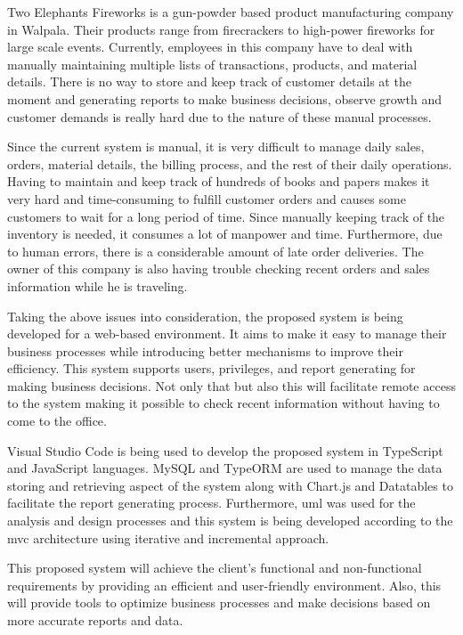 \documentclass[12pt]{report}
\begin{document}
Two Elephants Fireworks is a gun-powder based product manufacturing company in Walpala. Their products range from firecrackers to high-power fireworks for large scale events. Currently, employees in this company have to deal with manually maintaining multiple lists of transactions, products, and material details. There is no way to store and keep track of customer details at the moment and generating reports to make business decisions, observe growth and customer demands is really hard due to the nature of these manual processes.

Since the current system is manual, it is very difficult to manage daily sales, orders, material details, the billing process, and the rest of their daily operations. Having to maintain and keep track of hundreds of books and papers makes it very hard and time-consuming to fulfill customer orders and causes some customers to wait for a long period of time. Since manually keeping track of the inventory is needed, it consumes a lot of manpower and time. Furthermore, due to human errors, there is a considerable amount of late order deliveries. The owner of this company is also having trouble checking recent orders and sales information while he is traveling.

Taking the above issues into consideration, the proposed system is being developed for a web-based environment. It aims to make it easy to manage their business processes while introducing better mechanisms to improve their efficiency. This system supports users, privileges, and report generating for making business decisions. Not only that but also this will facilitate remote access to the system making it possible to check recent information without having to come to the office.

Visual Studio Code is being used to develop the proposed system in TypeScript and JavaScript languages. MySQL and TypeORM are used to manage the data storing and retrieving aspect of the system along with Chart.js and Datatables to facilitate the report generating process. Furthermore, \acrlong{uml} was used for the analysis and design processes and this system is being developed according to the \acrshort{mvc} architecture using iterative and incremental approach.

This proposed system will achieve the client's functional and non-functional requirements by providing an efficient and user-friendly environment. Also, this will provide tools to optimize business processes and make decisions based on more accurate reports and data.
\end{document}
